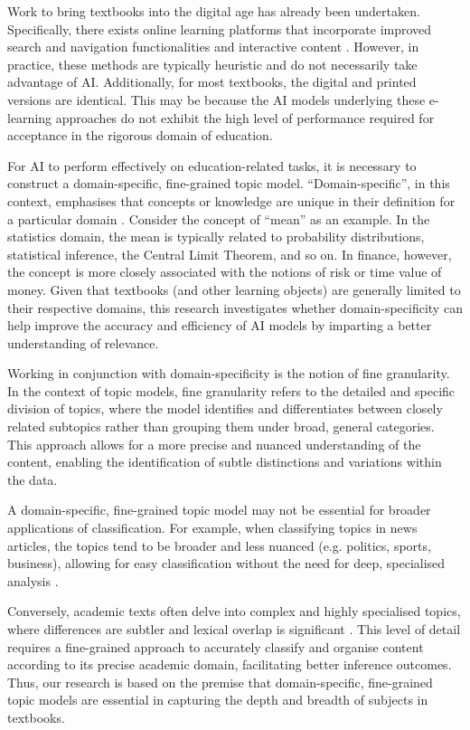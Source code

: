 \documentclass[twocolumn]{article}
\begin{document}
Work to bring textbooks into the digital age has already been undertaken. Specifically, there exists online learning platforms that incorporate improved search and navigation functionalities \cites{dichev2006,sosnovsky2014,brusilovsky1998,brusilovsky2007} and interactive content \cite{ericson2019}. However, in practice, these methods are typically heuristic and do not necessarily take advantage of AI. Additionally, for most textbooks, the digital and printed versions are identical. This may be because the AI models underlying these e-learning approaches do not exhibit the high level of performance required for acceptance in the rigorous domain of education.

For AI to perform effectively on education-related tasks, it is necessary to construct a domain-specific, fine-grained topic model. ``Domain-specific'', in this context, emphasises that concepts or knowledge are unique in their definition for a particular domain \cite{sekine1997}. Consider the concept of ``mean'' as an example. In the statistics domain, the mean is typically related to probability distributions, statistical inference, the Central Limit Theorem, and so on. In finance, however, the concept is more closely associated with the notions of risk or time value of money. Given that textbooks (and other learning objects) are generally limited to their respective domains, this research investigates whether domain-specificity can help improve the accuracy and efficiency of AI models by imparting a better understanding of relevance.

Working in conjunction with domain-specificity is the notion of fine granularity. In the context of topic models, fine granularity refers to the detailed and specific division of topics, where the model identifies and differentiates between closely related subtopics rather than grouping them under broad, general categories. This approach allows for a more precise and nuanced understanding of the content, enabling the identification of subtle distinctions and variations within the data. 

A domain-specific, fine-grained topic model may not be essential for broader applications of classification. For example, when classifying topics in news articles, the topics tend to be broader and less nuanced (e.g. politics, sports, business), allowing for easy classification without the need for deep, specialised analysis \cite{lee2011}.

Conversely, academic texts often delve into complex and highly specialised topics, where differences are subtler and lexical overlap is significant \cites{alpizarchacon2022,yang2018}. This level of detail requires a fine-grained approach to accurately classify and organise content according to its precise academic domain, facilitating better inference outcomes. Thus, our research is based on the premise that domain-specific, fine-grained topic models are essential in capturing the depth and breadth of subjects in textbooks.
\end{document}
